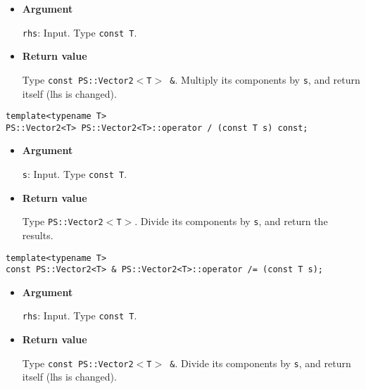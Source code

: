 \begin{itemize}

\item{{\bf Argument}}

\texttt{rhs}: Input. Type \texttt{const T}.

\item{{\bf Return value}}

Type \texttt{const PS::Vector2$<$T$>$ \&}. Multiply its components by \texttt{s},
and return itself (lhs is changed).

\end{itemize}

\begin{screen}
\begin{verbatim}
template<typename T>
PS::Vector2<T> PS::Vector2<T>::operator / (const T s) const;
\end{verbatim}
\end{screen}

\begin{itemize}

\item{{\bf Argument}}

\texttt{s}: Input. Type \texttt{const T}.

\item{{\bf Return value}}

Type \texttt{PS::Vector2$<$T$>$}. Divide its components by \texttt{s}, and return
the results.

\end{itemize}

\begin{screen}
\begin{verbatim}
template<typename T>
const PS::Vector2<T> & PS::Vector2<T>::operator /= (const T s);
\end{verbatim}
\end{screen}

\begin{itemize}

\item{{\bf Argument}}

\texttt{rhs}: Input. Type \texttt{const T}.

\item{{\bf Return value}}

Type \texttt{const PS::Vector2$<$T$>$ \&}. Divide its components by \texttt{s}, and
return itself (lhs is changed).

\end{itemize}

